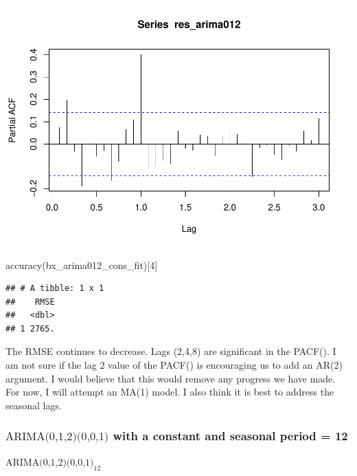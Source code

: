 \documentclass[
]{article}
\newenvironment{Shaded}{\begin{snugshade}}{\end{snugshade}}
\newcommand{\DecValTok}[1]{\textcolor[rgb]{0.00,0.00,0.81}{#1}}
\newcommand{\FunctionTok}[1]{\textcolor[rgb]{0.00,0.00,0.00}{#1}}
\newcommand{\NormalTok}[1]{#1}
\begin{document}
\includegraphics{eighth_meeting_notes_files/figure-latex/arima012-2.pdf}

\begin{Shaded}
\begin{Highlighting}[]
\FunctionTok{accuracy}\NormalTok{(bx\_arima012\_cons\_fit)[}\DecValTok{4}\NormalTok{]}
\end{Highlighting}
\end{Shaded}

\begin{verbatim}
## # A tibble: 1 x 1
##    RMSE
##   <dbl>
## 1 2765.
\end{verbatim}

The RMSE continues to decrease. Lags (2,4,8) are significant in the
PACF(). I am not sure if the lag 2 value of the PACF() is encouraging us
to add an AR(2) argument. I would believe that this would remove any
progress we have made. For now, I will attempt an MA(1) model. I also
think it is best to address the seasonal lags.

\hypertarget{textarima012001-with-a-constant-and-seasonal-period-12}{%
\subsubsection{\texorpdfstring{\(\text{ARIMA(0,1,2)(0,0,1)}\) with a
constant and seasonal period =
12}{\textbackslash text\{ARIMA(0,1,2)(0,0,1)\} with a constant and seasonal period = 12}}\label{textarima012001-with-a-constant-and-seasonal-period-12}}

\(\text{ARIMA(0,1,2)(0,0,1)}_{12}\)
\end{document}
